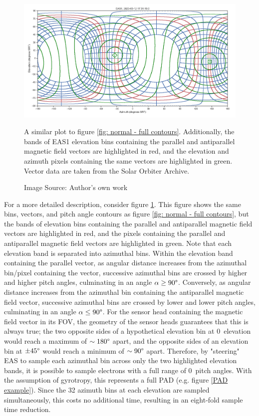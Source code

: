 \begin{figure}
    \centering
    \centerfloat
    \includegraphics[width=1.05\linewidth]{figures/fullcontours_justeas_yesselection.png}
    \caption{A similar plot to figure \ref{fig: normal - full contours}. Additionally, the bands of EAS1 elevation bins containing the parallel and antiparallel magnetic field vectors are highlighted in red, and the elevation and azimuth pixels containing the same vectors are highlighted in green. Vector data are taken from the Solar Orbiter Archive. }
    \caption*{Image Source: Author's own work}
    \label{fig: normal - full contours + selection}
\end{figure}

For a more detailed description, consider figure \ref{fig: normal - full contours + selection}. This figure shows the same bins, vectors, and pitch angle contours as figure \ref{fig: normal - full contours}, but the bands of elevation bins containing the parallel and antiparallel magnetic field vectors are highlighted in red, and the pixels containing the parallel and antiparallel magnetic field vectors are highlighted in green. Note that each elevation band is separated into azimuthal bins. Within the elevation band containing the parallel vector, as angular distance increases from the azimuthal bin/pixel containing the vector, successive azimuthal bins are crossed by higher and higher pitch angles, culminating in an angle \(\alpha\geq90\degree\). Conversely, as angular distance increases from the azimuthal bin containing the antiparallel magnetic field vector, successive azimuthal bins are crossed by lower and lower pitch angles, culminating in an angle \(\alpha\leq90\degree\). For the sensor head containing the magnetic field vector in its FOV, the geometry of the sensor heads guarantees that this is always true\cite{owen2021}; the two opposite sides of a hypothetical elevation bin at 0\degree\ elevation would reach a maximum of \(\sim180\degree\) apart, and the opposite sides of an elevation bin at \(\pm45\degree\) would reach a minimum of \(\sim90\degree\) apart. Therefore, by "steering" EAS to sample each azimuthal bin across only the two highlighted elevation bands, it is possible to sample electrons with a full range of 0\degree\ pitch angles. With the assumption of gyrotropy, this represents a full PAD (e.g. figure \ref{PAD example}). Since the 32 azimuth bins at each elevation are sampled simultaneously, this costs no additional time, resulting in an eight-fold sample time reduction.
\\

